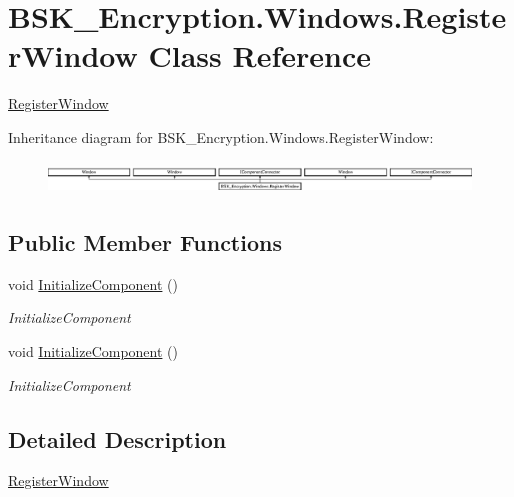 \hypertarget{class_b_s_k___encryption_1_1_windows_1_1_register_window}{}\section{B\+S\+K\+\_\+\+Encryption.\+Windows.\+Register\+Window Class Reference}
\label{class_b_s_k___encryption_1_1_windows_1_1_register_window}


\mbox{\hyperlink{class_b_s_k___encryption_1_1_windows_1_1_register_window}{Register\+Window}}  


Inheritance diagram for B\+S\+K\+\_\+\+Encryption.\+Windows.\+Register\+Window\+:\begin{figure}[H]
\begin{center}
\leavevmode
\includegraphics[height=0.861538cm]{class_b_s_k___encryption_1_1_windows_1_1_register_window}
\end{center}
\end{figure}
\subsection*{Public Member Functions}
\begin{DoxyCompactItemize}
\item 
void \mbox{\hyperlink{class_b_s_k___encryption_1_1_windows_1_1_register_window_a69ecfe0446850b9367f2a84191c9236c}{Initialize\+Component}} ()
\begin{DoxyCompactList}\small\item\em Initialize\+Component \end{DoxyCompactList}\item 
void \mbox{\hyperlink{class_b_s_k___encryption_1_1_windows_1_1_register_window_a69ecfe0446850b9367f2a84191c9236c}{Initialize\+Component}} ()
\begin{DoxyCompactList}\small\item\em Initialize\+Component \end{DoxyCompactList}\end{DoxyCompactItemize}


\subsection{Detailed Description}
\mbox{\hyperlink{class_b_s_k___encryption_1_1_windows_1_1_register_window}{Register\+Window}} 

